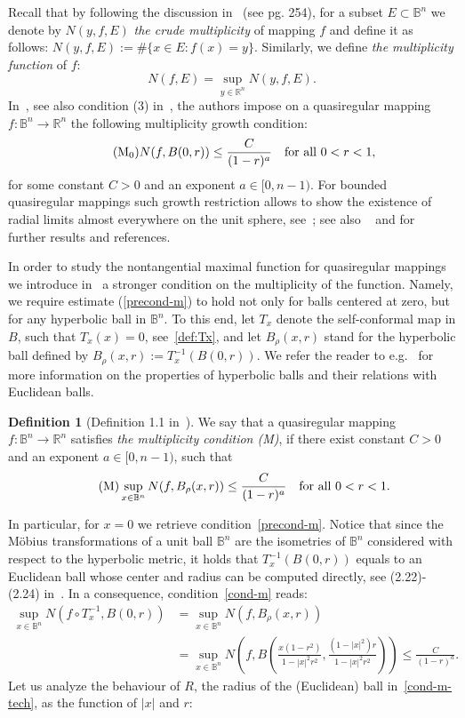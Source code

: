 \documentclass[11pt,a4paper,reqno]{amsart}
\theoremstyle{definition}
\newtheorem{defn}{Definition}[section]
\newcommand{\B}{\mathbb{B}^n}
\newcommand{\R}{\mathbb{R}}
\newcommand{\Rn}{{\mathbb R}^n}
\numberwithin{komcounter}{section}
\begin{document}
Recall that by following the discussion in~\cite{hkm} (see pg. 254), for a subset $E\subset \B$ we denote by $N(y, f, E)$ \emph{the crude multiplicity} of mapping $f$ and define it as follows: $N(y, f, E):=\#\{x\in E: f(x)=y\}$. Similarly, we define 
\emph{the multiplicity function} of $f$:
\[
N(f, E)=\sup_{y\in \R^n} N(y, f, E).
\]
 In~\cite[Theorem 4.1]{kmv}, see also condition (3) in~\cite{Ak}, the authors impose on a quasiregular mapping $f:\B\to \Rn$  the following multiplicity growth condition:
\begin{equation}\label{precond-m}\tag{${\rm M}_0$}
N(f, B(0,r))\leq \frac{C}{(1-r)^a}\quad \hbox{for all } 0<r<1,
\end{equation}
for some constant $C>0$ and an exponent $a\in [0, n-1)$. For bounded quasiregular mappings such growth restriction allows to show the existence of radial limits almost everywhere on the unit sphere, see~\cite{mr}; see also ~\cite[Ch. IV]{vuo2} and \cite[Ch. VII]{Ric} for further results and references.

In order to study the nontangential maximal function for quasiregular mappings we introduce in~\cite{ag2}  a stronger condition on the multiplicity of the function. Namely, we require estimate (\ref{precond-m}) to hold not only for balls  centered at zero, but for any hyperbolic ball in $\B$. To this end, let $T_x$ denote the self-conformal map in $B$, such that $T_x(x)=0$, see~\eqref{def:Tx}, and let $B_\rho (x,r)$ stand for the hyperbolic ball defined by $B_\rho (x,r):= T_x^{-1}(B(0,r))$.   We  refer the reader to  e.g.~\cite[Ch. I.2]{vuo2} for more information on the properties of hyperbolic balls and their relations with Euclidean balls.  

\begin{defn}[Definition 1.1 in~\cite{ag2}]\label{def-multi}
	We say that a quasiregular mapping $f:\B\to \Rn$ satisfies \emph{the multiplicity condition (M)}, if there exist constant $C>0$ and an exponent $a\in [0, n-1)$, such  that
	\begin{equation}\label{cond-m}\tag{M}
	\sup_{x\in \B} N(f, B_\rho(x, r))\leq \frac{C}{(1-r)^a}\quad \hbox{for all } 0<r<1.
	\end{equation}
\end{defn}
In particular, for $x=0$ we retrieve condition~\eqref{precond-m}. Notice that since the M\"obius transformations of a unit ball $\B$ are the isometries of $\B$ considered with respect to the hyperbolic metric, it holds that $T_x^{-1}(B(0,r))$ equals to an Euclidean ball whose center and radius can be computed directly, see (2.22)-(2.24) in~\cite[Ch. I.2]{vuo2}. In a consequence, condition~\eqref{cond-m} reads:
\begin{align}
\sup_{x\in \B} N(f\circ T_x^{-1}, B(0, r)) &=\sup_{x\in \B} N(f, B_\rho(x, r)) \nonumber \\
&=\sup_{x\in \B} N\left(f, B\left(\frac{x(1-r^2)}{1-|x|^2r^2}, \frac{(1-|x|^2)r}{1-|x|^2r^2}\right)\right)\leq \frac{C}{(1-r)^a}. \label{cond-m-tech}
\end{align}
Let us analyze the behaviour of $R$, the radius of the (Euclidean) ball in~\eqref{cond-m-tech}, as the function of $|x|$ and $r$:
\medskip
\end{document}

